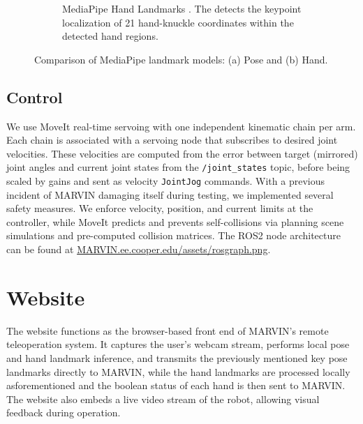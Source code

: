 \documentclass[acmsmall, screen]{acmart}
\begin{document}
\begin{figure}[htbp]
\begin{subfigure}[b]{0.35\linewidth}
    \caption{MediaPipe Hand Landmarks \cite{HandLandmarksDetection}. The detects the keypoint localization of 21 hand-knuckle coordinates within the detected hand regions.}
    \label{fig:hand-landmarks}
  \end{subfigure}
  \caption{Comparison of MediaPipe landmark models: (a) Pose and (b) Hand.}
  \label{fig:landmarks-comparison}
\end{figure}

\subsection{Control}
We use MoveIt real-time servoing with one independent kinematic chain per arm. Each chain is associated with a servoing node that subscribes to desired joint velocities. These velocities are computed from the error between target (mirrored) joint angles and current joint states from the \texttt{/joint\_states} topic, before being scaled by gains and sent as velocity \texttt{JointJog} commands. With a previous incident of MARVIN damaging itself during testing, we implemented several safety measures. We enforce velocity, position, and current limits at the controller, while MoveIt predicts and prevents self-collisions via planning scene simulations and pre-computed collision matrices.
The ROS2 node architecture can be found at \url{MARVIN.ee.cooper.edu/assets/rosgraph.png}.


\section{Website}
The website functions as the browser-based front end of MARVIN’s remote teleoperation system. It captures the user’s webcam stream, performs local pose and hand landmark inference, and transmits the previously mentioned key pose landmarks directly to MARVIN, while the hand landmarks are processed locally asforementioned and the boolean status of each hand is then sent to MARVIN. The website also embeds a live video stream of the robot, allowing visual feedback during operation. 
\end{document}
